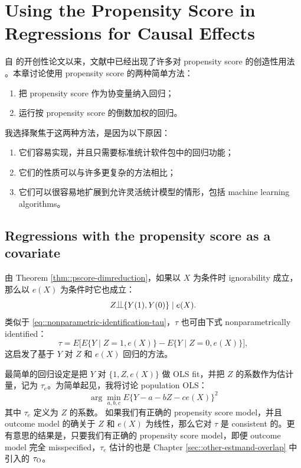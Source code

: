 \chapter{Using the Propensity Score in Regressions for Causal Effects}\label{chapter::pscore-unification}
 

自 \citet{rosenbaum1983central} 的开创性论文以来，文献中已经出现了许多对 propensity score 的创造性用法 \citep[e.g.,][]{bang2005doubly, robins2007comment, van2011targeted, vansteelandt2014regression}。本章讨论使用 propensity score 的两种简单方法：
\begin{enumerate}
\item
把 propensity score 作为协变量纳入回归；
\item
运行按 propensity score 的倒数加权的回归。
\end{enumerate}
我选择聚焦于这两种方法，是因为以下原因：
\begin{enumerate}
\item
它们容易实现，并且只需要标准统计软件包中的回归功能；
\item
它们的性质可以与许多更复杂的方法相比；
\item
它们可以很容易地扩展到允许灵活统计模型的情形，包括 machine learning algorithms。
\end{enumerate}

 
\section{Regressions with the propensity score as a covariate}
\label{sec::regress-on-pscore}

由 Theorem \ref{thm::pscore-dimreduction}，如果以 $X$ 为条件时 ignorability 成立，那么以 $e(X)$ 为条件时它也成立：
$$
Z\ind \{ Y(1) , Y(0)\} \mid e(X). 
$$ 
类似于 \eqref{eq::nonparametric-identification-tau}，$\tau$ 也可由下式 nonparametrically identified：
$$
\tau = E\Big[   E\{ Y\mid Z=1, e(X) \} - E\{ Y\mid Z=0, e(X) \} \Big] ,
$$
这启发了基于 $Y$ 对 $Z$ 和 $e(X)$ 回归的方法。



最简单的回归设定是把 $Y$ 对 $\{1, Z, e(X)\}$ 做 OLS fit，并把 $Z$ 的系数作为估计量，记为 $\tau_{e}$。为简单起见，我将讨论 population OLS：
$$
\arg\min_{a,b,c}  E\{ Y - a - bZ - c  e(X)  \}^2
$$
其中 $\tau_{e}$ 定义为 $Z$ 的系数。
如果我们有正确的 propensity score model，并且 outcome model 的确关于 $Z$ 和 $e(X)$ 为线性，那么它对 $\tau$ 是 consistent 的。更有意思的结果是，只要我们有正确的 propensity score model，即便 outcome model 完全 misspecified，$\tau_{e}$ 估计的也是 Chapter \ref{sec::other-estmand-overlap} 中引入的 $\tau_\textsc{O}$。

